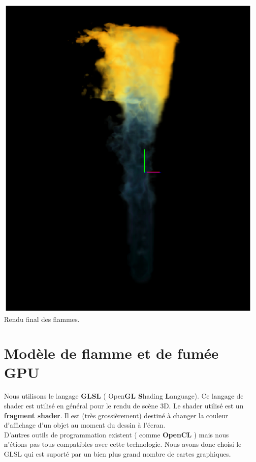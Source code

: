 \documentclass[a4paper,10pt]{article}
\begin{document}
\begin{center}
	\includegraphics[scale=0.7]{FlammeBleue2.ps}
	Rendu final des flammes.
    \end{center}  




\newpage
\section{Modèle de flamme et de fumée GPU}

Nous utilisons le langage \textbf{GLSL} ( Open\textbf{GL S}hading
\textbf{L}anguage).  Ce langage de shader est utilisé en général pour
le rendu de scène 3D. Le shader utilisé est un \textbf{fragment
  shader}.  Il est (très grossièrement) destiné à changer la couleur
d'affichage d'un objet au moment du dessin à l'écran.\\ 
D'autres outils de programmation existent (
comme \textbf{OpenCL} ) mais nous n'étions pas tous compatibles avec cette
technologie.  Nous avons donc choisi le GLSL qui est suporté par un
bien plus grand nombre de cartes graphiques.\\
\end{document}
